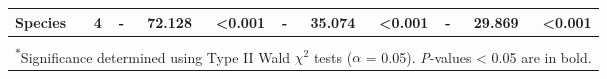 \begin{landscape}
\begin{table}[]
{\begin{tabular}{p{2.5cm}p{0.5cm}p{2cm}p{1.5cm}p{1.5cm}p{2cm}p{1.5cm}p{1.5cm}p{2cm}p{1.5cm}p{1.5cm}}
                 Species & \multicolumn{1}{r}{4}
                 & \multicolumn{1}{r}{-} & \multicolumn{1}{r}{72.128} &  \multicolumn{1}{r}{\textbf{\textless{}0.001}}
                 & \multicolumn{1}{r}{-} & \multicolumn{1}{r}{35.074} &  \multicolumn{1}{r}{\textbf{\textless{}0.001}}
                 & \multicolumn{1}{r}{-} & \multicolumn{1}{r}{29.869} &  \multicolumn{1}{r}{\textbf{\textless{}0.001}}
                 \\
                 \hline

                 &&&&&&&&&& 
                 \\

                 \multicolumn{11}{p{22.5cm}}{\textsuperscript{$*$}Significance determined using Type II Wald $\chi^{2}$ tests ($\alpha$ = 0.05). \textit{P}-values < 0.05 are in bold.}
        \end{tabular}}
        \label{tab:table3.1}
        \end{table}
    \end{landscape}
    \clearpage


